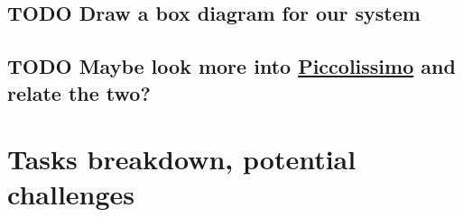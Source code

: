 \documentclass[11pt]{article}
\begin{document}
\subsection{{\bfseries\sffamily TODO} Draw a box diagram for our system}
\label{sec:org97ad50a}
\subsection{{\bfseries\sffamily TODO} Maybe look more into \href{https://www.upenn.edu/spotlights/meet-piccolissimo-worlds-smallest-self-powered-controllable-flying-vehicle}{Piccolissimo} and relate the two?}
\label{sec:orgd2aeba8}

\section{Tasks breakdown, potential challenges}
\label{sec:org57996fc}
\end{document}
